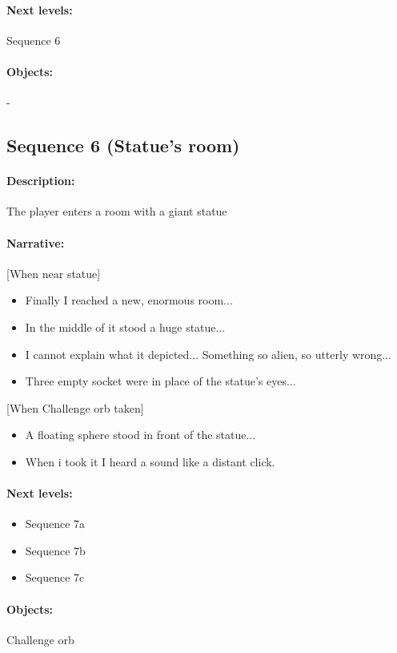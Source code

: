 \documentclass{article}
\begin{document}
\paragraph{Next levels: } Sequence 6
\paragraph{Objects: } -

\subsection{Sequence 6 (Statue's room)}

\paragraph{Description: } The player enters a room with a giant statue
\paragraph{Narrative: } 
[When near statue]
\begin{itemize}
\item Finally I reached a new, enormous room...
\item In the middle of it stood a huge statue...
\item I cannot explain what it depicted... Something so alien, so utterly wrong...
\item Three empty socket were in place of the statue's eyes...
\end{itemize}
[When Challenge orb taken]
\begin{itemize}
\item A floating sphere stood in front of the statue...
\item When i took it I heard a sound like a distant click.
\end{itemize}
\paragraph{Next levels: }
\begin{itemize}
\item Sequence 7a
\item Sequence 7b
\item Sequence 7c
\end{itemize}
\paragraph{Objects: } Challenge orb
\end{document}
